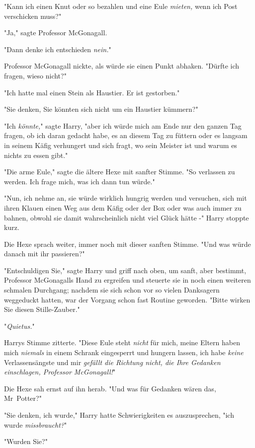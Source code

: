 {"Kann ich einen Knut oder so bezahlen und eine Eule \emph{mieten,} wenn ich Post verschicken muss?"

"Ja," sagte Professor McGonagall.

"Dann denke ich entschieden \emph{nein.}"

Professor McGonagall nickte, als würde sie einen Punkt abhaken. "Dürfte ich fragen, wieso nicht?"

"Ich hatte mal einen Stein als Haustier. Er ist gestorben."

"Sie denken, Sie könnten sich nicht um ein Haustier kümmern?"

"Ich \emph{könnte,}" sagte Harry, "aber ich würde mich am Ende nur den ganzen Tag fragen, ob ich daran gedacht habe, es an diesem Tag zu füttern oder es langsam in seinem Käfig verhungert und sich fragt, wo sein Meister ist und warum es nichts zu essen gibt."

"Die arme Eule," sagte die ältere Hexe mit sanfter Stimme. "So verlassen zu werden. Ich frage mich, was ich dann tun würde."

"Nun, ich nehme an, sie würde wirklich hungrig werden und versuchen, sich mit ihren Klauen einen Weg aus dem Käfig oder der Box oder was auch immer zu bahnen, obwohl sie damit wahrscheinlich nicht viel Glück hätte -" Harry stoppte kurz.

Die Hexe sprach weiter, immer noch mit dieser sanften Stimme. "Und was würde danach mit ihr passieren?"

"Entschuldigen Sie," sagte Harry und griff nach oben, um sanft, aber bestimmt, Professor McGonagalls Hand zu ergreifen und steuerte sie in noch einen weiteren schmalen Durchgang; nachdem sie sich schon vor so vielen Danksagern weggeduckt hatten, war der Vorgang schon fast Routine geworden. "Bitte wirken Sie diesen Stille-Zauber."

"\emph{Quietus.}"

Harrys Stimme zitterte. "Diese Eule steht \emph{nicht} für mich, meine Eltern haben mich \emph{niemals} in einem Schrank eingesperrt und hungern lassen, ich habe \emph{keine} Verlassensängste und mir \emph{gefällt die Richtung nicht, die Ihre Gedanken einschlagen, Professor McGonagall!}"

Die Hexe sah ernst auf ihn herab. "Und was für Gedanken wären das, Mr~Potter?"

"Sie denken, ich wurde," Harry hatte Schwierigkeiten es auszusprechen, "ich wurde \emph{missbraucht?}"

"Wurden Sie?"

}
